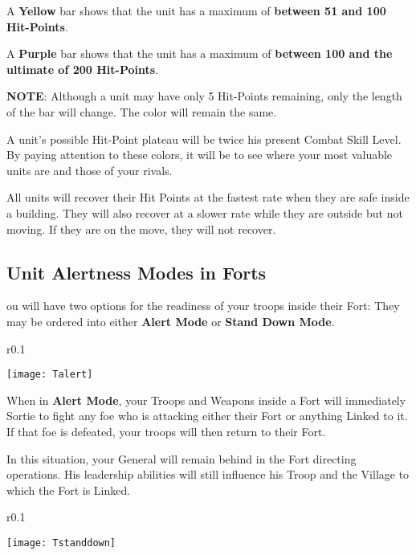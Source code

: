 A \textbf{Yellow} bar shows that the unit has a maximum of \textbf{between 51 and 100 Hit-Points}.

A \textbf{Purple} bar shows that the unit has a maximum of \textbf{between 100 and the ultimate of 200 Hit-Points}.

\textbf{NOTE}: Although a unit may have only 5 Hit-Points remaining, only the length of the bar will change. The color will remain the same.


A unit’s possible Hit-Point plateau will be twice his present Combat Skill Level. By paying attention to these colors, it will be to see where your most valuable units are and those of your rivals.

All units will recover their Hit Points at the fastest rate when they are safe inside a building. They will also recover at a slower rate while they are outside but not moving. If they are on the move, they will not recover.

\subsection{{Unit Alertness Modes in Forts}}


ou will have two options for the readiness of your troops inside their Fort: They may be ordered into either \textbf{Alert Mode} or \textbf{Stand Down Mode}.

\begin{wrapfigure}{r}{0.1\textwidth}
    \vspace{-20pt}
    \begin{center}
        \texttt{[image: Talert]}
    \end{center}
    \vspace{-20pt}
\end{wrapfigure}

When in \textbf{Alert Mode}, your Troops and Weapons inside a Fort will immediately Sortie to fight any foe who is attacking either their Fort or anything Linked to it. If that foe is defeated, your troops will then return to their Fort.

In this situation, your General will remain behind in the Fort directing operations. His leadership abilities will still influence his Troop and the Village to which the Fort is Linked.

\begin{wrapfigure}{r}{0.1\textwidth}
    \vspace{-20pt}
    \begin{center}
        \texttt{[image: Tstanddown]}
    \end{center}
    \vspace{-20pt}
\end{wrapfigure}

